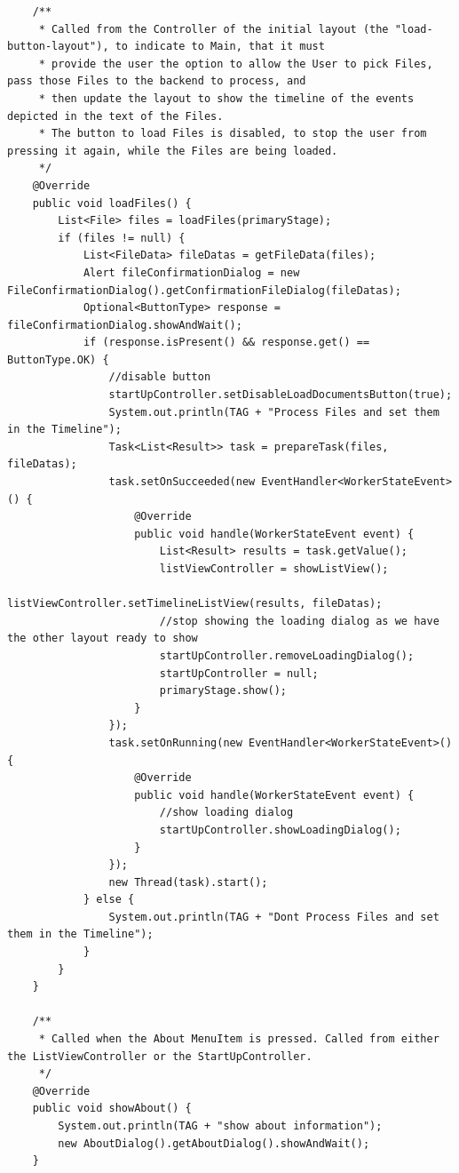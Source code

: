 \begin{lstlisting}
    /**
     * Called from the Controller of the initial layout (the "load-button-layout"), to indicate to Main, that it must
     * provide the user the option to allow the User to pick Files, pass those Files to the backend to process, and
     * then update the layout to show the timeline of the events depicted in the text of the Files.
     * The button to load Files is disabled, to stop the user from pressing it again, while the Files are being loaded.
     */
    @Override
    public void loadFiles() {
        List<File> files = loadFiles(primaryStage);
        if (files != null) {
            List<FileData> fileDatas = getFileData(files);
            Alert fileConfirmationDialog = new FileConfirmationDialog().getConfirmationFileDialog(fileDatas);
            Optional<ButtonType> response = fileConfirmationDialog.showAndWait();
            if (response.isPresent() && response.get() == ButtonType.OK) {
                //disable button
                startUpController.setDisableLoadDocumentsButton(true);
                System.out.println(TAG + "Process Files and set them in the Timeline");
                Task<List<Result>> task = prepareTask(files, fileDatas);
                task.setOnSucceeded(new EventHandler<WorkerStateEvent>() {
                    @Override
                    public void handle(WorkerStateEvent event) {
                        List<Result> results = task.getValue();
                        listViewController = showListView();
                        listViewController.setTimelineListView(results, fileDatas);
                        //stop showing the loading dialog as we have the other layout ready to show
                        startUpController.removeLoadingDialog();
                        startUpController = null;
                        primaryStage.show();
                    }
                });
                task.setOnRunning(new EventHandler<WorkerStateEvent>() {
                    @Override
                    public void handle(WorkerStateEvent event) {
                        //show loading dialog
                        startUpController.showLoadingDialog();
                    }
                });
                new Thread(task).start();
            } else {
                System.out.println(TAG + "Dont Process Files and set them in the Timeline");
            }
        }
    }

    /**
     * Called when the About MenuItem is pressed. Called from either the ListViewController or the StartUpController.
     */
    @Override
    public void showAbout() {
        System.out.println(TAG + "show about information");
        new AboutDialog().getAboutDialog().showAndWait();
    }


\end{lstlisting}
